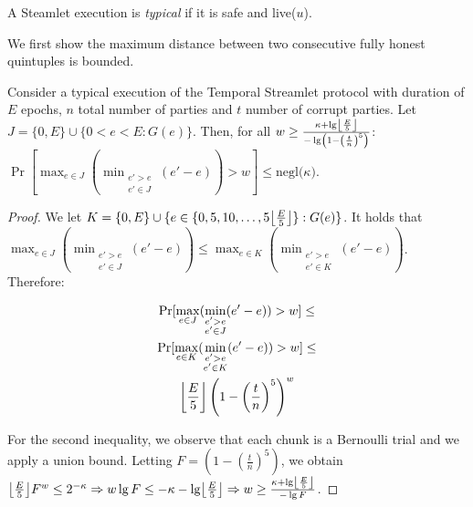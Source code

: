 \begin{definition}
  A Steamlet execution is \emph{typical} if it is safe and live($u$).
\end{definition}

We first show the maximum distance between two consecutive fully honest quintuples
is bounded.

\begin{lemma} \label{lem:honest-quintuple}
  Consider a typical execution of the Temporal Streamlet protocol with duration
  of $E$ epochs, $n$ total number of parties and $t$ number of corrupt parties.
  Let $J = \{0,E\} \cup \{0 < e < E: G(e)\}$.
  Then, for all $w \geq \frac{\kappa + \lg \floor*{\frac{E}{5}}}{- \lg \left(1 - \left(\frac{t}{n}\right)^5\right)}$:
  $\Pr [\max_{e \in J}(\min_{\substack{e' > e \\ e' \in J}}(e' - e)) > w] \leq \text{negl($\kappa$)}$.
\end{lemma}
\begin{proof}
  We let $K = \{0, E\} \cup \{e \in \{0, 5, 10 ,\ldots, 5\floor*{\frac{E}{5}}\}: G(e)\}$.
  It holds that
  $\max_{e \in J}(\min_{\substack{e' > e \\ e' \in J}}(e' - e)) \leq \max_{e \in K}(\min_{\substack{e' > e \\ e' \in K}}(e' - e))$.
  Therefore:

  \begin{gather*}
      \Pr [\max_{e \in J}(\min_{\substack{e' > e \\ e' \in J}}(e' - e)) > w] \leq \\
      \Pr [\max_{e \in K}(\min_{\substack{e' > e \\ e' \in K}}(e' - e)) > w] \leq \\
      \floor*{\frac{E}{5}} \left(1 - \left(\frac{t}{n}\right)^5\right)^w
  \end{gather*}

  For the second inequality, we observe that each chunk is a Bernoulli trial and we
  apply a union bound.
  Letting $F = \left(1 - \left(\frac{t}{n}\right)^5\right)$, we obtain
  $\floor*{\frac{E}{5}} F^w \leq 2^{-\kappa} \Rightarrow
   w \lg F \leq -\kappa - \lg \floor*{\frac{E}{5}} \Rightarrow
   w \geq \frac{\kappa + \lg \floor*{\frac{E}{5}}}{- \lg F}
  $.
  \Qed
\end{proof}


